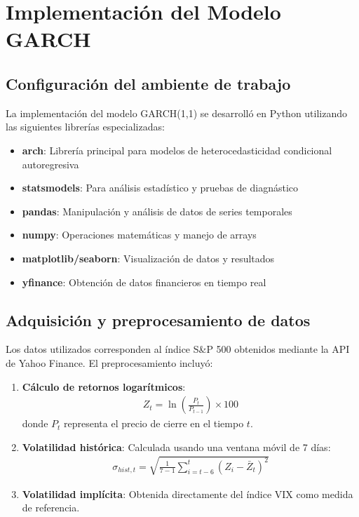 \section{Implementación del Modelo GARCH}

\subsection{Configuración del ambiente de trabajo}

La implementación del modelo GARCH(1,1) se desarrolló en Python utilizando las siguientes librerías especializadas:

\begin{itemize}
    \item \textbf{arch}: Librería principal para modelos de heterocedasticidad condicional autoregresiva
    \item \textbf{statsmodels}: Para análisis estadístico y pruebas de diagnástico
    \item \textbf{pandas}: Manipulación y análisis de datos de series temporales
    \item \textbf{numpy}: Operaciones matemáticas y manejo de arrays
    \item \textbf{matplotlib/seaborn}: Visualización de datos y resultados
    \item \textbf{yfinance}: Obtención de datos financieros en tiempo real
\end{itemize}

\subsection{Adquisición y preprocesamiento de datos}

Los datos utilizados corresponden al índice S\&P 500 obtenidos mediante la API de Yahoo Finance. El preprocesamiento incluyó:

\begin{enumerate}
    \item \textbf{Cálculo de retornos logarítmicos}: 
    \begin{align}
        Z_t = \ln\left(\frac{P_t}{P_{t-1}}\right) \times 100
    \end{align}
    donde $P_t$ representa el precio de cierre en el tiempo $t$.
    
    \item \textbf{Volatilidad histórica}: Calculada usando una ventana móvil de 7 días:
    \begin{align}
        \sigma_{hist,t} = \sqrt{\frac{1}{7-1}\sum_{i=t-6}^{t}(Z_i - \bar{Z}_t)^2}
    \end{align}
    
    \item \textbf{Volatilidad implícita}: Obtenida directamente del índice VIX como medida de referencia.
\end{enumerate}

